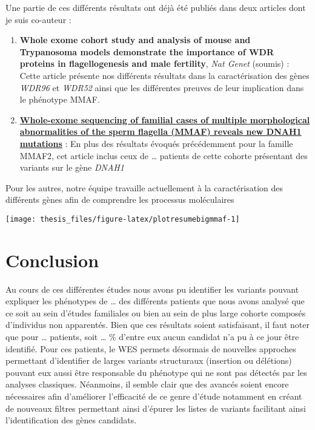 \documentclass[12pt,twoside]{reedthesis}
\theoremstyle{definition}
\theoremstyle{definition}
\theoremstyle{remark}
\begin{document}
  Une partie de ces différents résultats ont déjà été publiés dans deux
  articles dont je suis co-auteur :
  
  \begin{enumerate}
  \def\labelenumi{\arabic{enumi}.}
  \item
    \textbf{Whole exome cohort study and analysis of mouse and Trypanosoma
    models demonstrate the importance of WDR proteins in flagellogenesis
    and male fertility}, \emph{Nat Genet} (soumis) : Cette article
    présente nos différents résultats dans la caractérisation des gènes
    \emph{WDR96} et \emph{WDR52} ainsi que les différentes preuves de leur
    implication dans le phénotype MMAF.
  \item
    \protect\hyperlink{famdnah1}{\textbf{Whole-exome sequencing of
    familial cases of multiple morphological abnormalities of the sperm
    flagella (MMAF) reveals new DNAH1 mutations}} : En plus des résultats
    évoqués précédemment pour la famille MMAF2, cet article inclus ceux de
    \ldots{} patients de cette cohorte présentant des variants sur le gène
    \emph{DNAH1}
  \end{enumerate}
  
  Pour les autres, notre équipe travaille actuellement à la
  caractérisation des différents gènes afin de comprendre les processus
  moléculaires
  
  \newpage
  
  \begin{center}\texttt{[image: thesis\_files/figure-latex/plotresumebigmmaf-1]} \end{center}
  
  \newpage
  
  \newpage
  
  \newpage 
  
  \section{Conclusion}\label{conclusion}
  
  Au cours de ces différentes études nous avons pu identifier les variants
  pouvant expliquer les phénotypes de \ldots{} des différents patients que
  nous avons analysé que ce soit au sein d'études familiales ou bien au
  sein de plus large cohorte composés d'individus non apparentés. Bien que
  ces résultats soient satisfaisant, il faut noter que pour \ldots{}
  patients, soit \ldots{} \% d'entre eux aucun candidat n'a pu à ce jour
  être identifié. Pour ces patients, le WES permets désormais de nouvelles
  approches permettant d'identifier de larges variants structuraux
  (insertion ou délétions) pouvant eux aussi être responsable du phénotype
  qui ne sont pas détectés par les analyses classiques. Néanmoins, il
  semble clair que des avancés soient encore nécessaires afin d'améliorer
  l'efficacité de ce genre d'étude notamment en créant de nouveaux filtres
  permettant ainsi d'épurer les listes de variants facilitant ainsi
  l'identification des gènes candidats.
  
\end{document}
